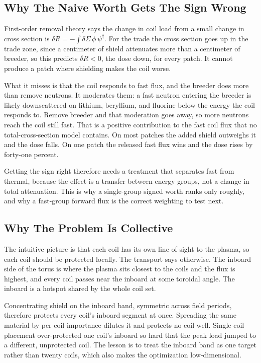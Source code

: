 \documentclass[11pt]{article}
\begin{document}
\subsection{Why The Naive Worth Gets The Sign Wrong}
First-order removal theory says the change in coil load from a small change in cross section is
$\delta R=-\int \delta\Sigma\,\phi\,\psi^\dagger$. For the trade the cross section goes up in the
trade zone, since a centimeter of shield attenuates more than a centimeter of breeder, so this
predicts $\delta R<0$, the dose down, for every patch. It cannot produce a patch where shielding
makes the coil worse.

What it misses is that the coil responds to fast flux, and the breeder does more than remove
neutrons. It moderates them: a fast neutron entering the breeder is likely downscattered on lithium,
beryllium, and fluorine below the energy the coil responds to. Remove breeder and that moderation
goes away, so more neutrons reach the coil still fast. That is a positive contribution to the fast
coil flux that no total-cross-section model contains. On most patches the added shield outweighs it
and the dose falls. On one patch the released fast flux wins and the dose rises by forty-one percent.

Getting the sign right therefore needs a treatment that separates fast from thermal, because the
effect is a transfer between energy groups, not a change in total attenuation. This is why a
single-group signed worth ranks only roughly, and why a fast-group forward flux is the correct
weighting to test next.

\subsection{Why The Problem Is Collective}
The intuitive picture is that each coil has its own line of sight to the plasma, so each coil should
be protected locally. The transport says otherwise. The inboard side of the torus is where the
plasma sits closest to the coils and the flux is highest, and every coil passes near the inboard at
some toroidal angle. The inboard is a hotspot shared by the whole coil set.

Concentrating shield on the inboard band, symmetric across field periods, therefore protects every
coil's inboard segment at once. Spreading the same material by per-coil importance dilutes it and
protects no coil well. Single-coil placement over-protected one coil's inboard so hard that the peak
load jumped to a different, unprotected coil. The lesson is to treat the inboard band as one target
rather than twenty coils, which also makes the optimization low-dimensional.
\end{document}
